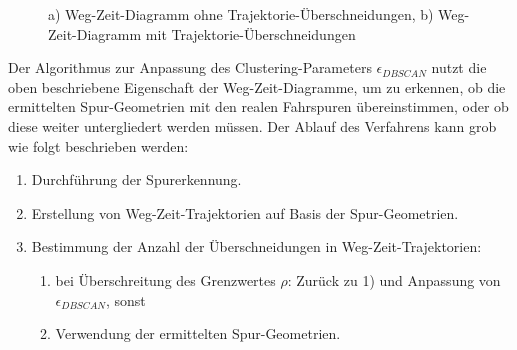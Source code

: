 \begin{figure}[H]
    \centering
    \qquad
    \caption[Weg-Zeit-Diagramme mit und ohne Trajektorie-Schnittpunkten]
            {a) Weg-Zeit-Diagramm ohne Trajektorie-Überschneidungen, b) Weg-Zeit-Diagramm mit Trajektorie-Überschneidungen}
    \label{fig:real1_way_time_diagramms}
\end{figure}

Der Algorithmus zur Anpassung des Clustering-Parameters $\epsilon_{DBSCAN}$ nutzt die oben beschriebene
Eigenschaft der Weg-Zeit-Diagramme, um zu erkennen, ob die ermittelten Spur-Geometrien mit den realen
Fahrspuren übereinstimmen, oder ob diese weiter untergliedert werden müssen.
Der Ablauf des Verfahrens kann grob wie folgt beschrieben werden:

\begin{enumerate}
    \item Durchführung der Spurerkennung.
    \item Erstellung von Weg-Zeit-Trajektorien auf Basis der Spur-Geometrien.
    \item Bestimmung der Anzahl der Überschneidungen in Weg-Zeit-Trajektorien:
    \begin{enumerate}
        \item bei Überschreitung des Grenzwertes $\rho$: Zurück zu 1) und Anpassung von\\ $\epsilon_{DBSCAN}$, sonst
        \item Verwendung der ermittelten Spur-Geometrien.
    \end{enumerate}
\end{enumerate}

